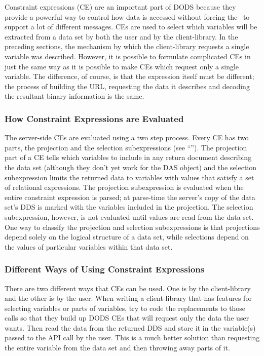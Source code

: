 Constraint expressions (CE) are an important part of DODS because they
provide a powerful way to control how data is accessed without forcing the
\Dap\ to support a lot of different messages. CEs are used to select which
variables will be extracted from a data set by both the user and by the
client-library. In the preceding sections, the mechanism by which the
client-library requests a single variable was described. However, it is
possible to formulate complicated CEs in just the same way as it is possible
to make CEs which request only a single variable. The difference, of course,
is that the expression itself must be different; the process of building the
URL, requesting the data it describes and decoding the resultant binary
information is the same.

\subsubsection{How Constraint Expressions are Evaluated}
\label{tk:ce-evaluation}

The server-side CEs are evaluated using a two step process. Every CE has
two parts, the projection and the selection subexpressions (see ``\DAP''). The
projection part of a CE tells which variables to include in any return
document describing the data set (although they don't yet work for the DAS
object) and the selection subexpression limits the returned data to variables
with values that satisfy a set of relational expressions. The projection
subexpression is evaluated when the entire constraint expression is parsed;
at parse-time the server's copy of the data set's DDS is marked with the
variables included in the projection. The selection subexpression, however,
is not evaluated until values are read from the data set. One way to classify
the projection and selection subexpressions is that projections depend solely
on the logical structure of a data set, while selections depend on the values
of particular variables within that data set.

\subsubsection{Different Ways of Using Constraint Expressions}
\label{tk:using-constraints}

There are two different ways that CEs can be used. One is by the
client-library and the other is by the user. When writing a client-library
that has features for selecting variables or parts of variables, try to code
the replacements to those calls so that they build up DODS CEs that will
request only the data the user wants. Then read the data from the returned
DDS and store it in the variable(s) passed to the API call by the user. This
is a much better solution than requesting the entire variable from the data
set and then throwing away parts of it.

